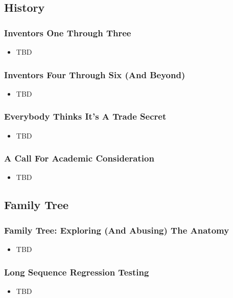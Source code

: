 \subsection{History}

\begin{frame}
  \frametitle{Inventors One Through Three}
  \begin{itemize}
    \item TBD
  \end{itemize}
\end{frame}

\begin{frame}
  \frametitle{Inventors Four Through Six (And Beyond)}
  \begin{itemize}
    \item TBD
  \end{itemize}
\end{frame}

\begin{frame}
  \frametitle{Everybody Thinks It's A Trade Secret}
  \begin{itemize}
    \item TBD
  \end{itemize}
\end{frame}

\begin{frame}
  \frametitle{A Call For Academic Consideration}
  \begin{itemize}
    \item TBD
  \end{itemize}
\end{frame}

\subsection{Family Tree}

\begin{frame}
  \frametitle{Family Tree: Exploring (And Abusing) The Anatomy}
  \begin{itemize}
    \item TBD
  \end{itemize}
\end{frame}

\begin{frame}
  \frametitle{Long Sequence Regression Testing}
  \begin{itemize}
    \item TBD
  \end{itemize}
\end{frame}

